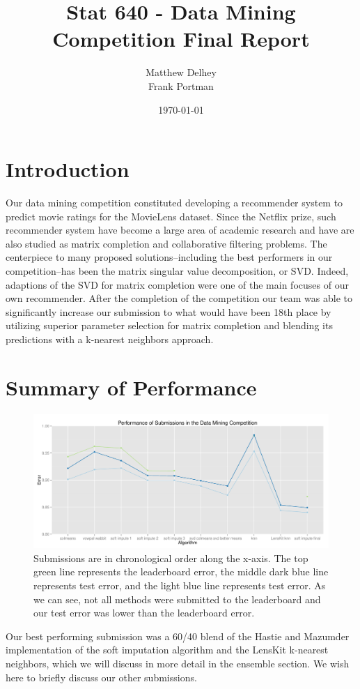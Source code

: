 \documentclass[oneside]{article}
\title{Stat 640 - Data Mining Competition Final Report}
\author{Matthew Delhey \\ Frank Portman}
\date{\today}
\begin{document}
\maketitle 

\section{Introduction}
Our data mining competition constituted developing a recommender system to predict movie ratings for the MovieLens dataset. Since the Netflix prize, such recommender system have become a large area of academic research and have are also studied as matrix completion and collaborative filtering problems. The centerpiece to many proposed solutions--including the best performers in our competition--has been the matrix singular value decomposition, or SVD. Indeed, adaptions of the SVD for matrix completion were one of the main focuses of our own recommender. After the completion of the competition our team was able to significantly increase our submission to what would have been 18th place by utilizing superior parameter selection for matrix completion and blending its predictions with a k-nearest neighbors approach.

\section{Summary of Performance}
\begin{figure}[htpd]
  \centering
  \includegraphics[width = 0.95\linewidth]{vis}
  \caption{Submissions are in chronological order along the x-axis. The top green line represents the leaderboard error, the middle dark blue line represents test error, and the light blue line represents test error. As we can see, not all methods were submitted to the leaderboard and our test error was lower than the leaderboard error.}
  \label{fig:one}
\end{figure}

Our best performing submission was a 60/40 blend of the Hastie and Mazumder implementation of the soft imputation algorithm and the LensKit k-nearest neighbors, which we will discuss in more detail in the ensemble section. We wish here to briefly discuss our other submissions. 
\end{document}
